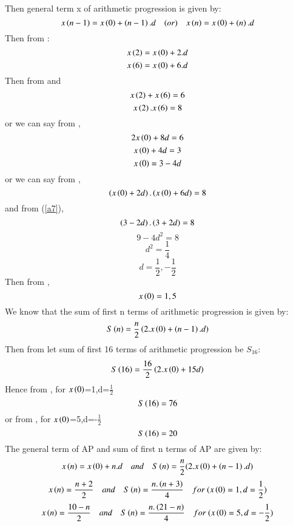 \documentclass[beamer]{IEEEtran}
\theoremstyle{remark}
\begin{document}
Then general term x of arithmetic progression is given by:
\begin{equation}
\label{a2}
x\left(n-1\right)=x\left(0\right)+\left(n-1\right).d\quad (or)\quad x\left(n\right)=x\left(0\right)+\left(n\right).d
\end{equation}
Then from \brak{\ref{a2}}:
\begin{equation}
\label{a3}
x\left(2\right) = x\left(0\right)+2.d
\end{equation}
\begin{equation}
\label{a4}
x\left(6\right)=x\left(0\right)+6.d
\end{equation} 
Then from \brak{\ref{a3}} and \brak{\ref{a4}}
\begin{equation}
\label{a5}
x\left(2\right)+x\left(6\right)=6
\end{equation}
\begin{equation}
\label{a6}
x\left(2\right).x\left(6\right)=8
\end{equation}
or we can say from \brak{\ref{a5}},
\[2x\left(0\right)+8d=6\]
\[x\left(0\right)+4d=3\]
\begin{equation}
\label{a7}
x\left(0\right)=3-4d
\end{equation}
or we can say from \brak{\ref{a6}},
$$\left(x\left(0\right)+2d\right).\left(x\left(0\right)+6d\right)=8$$
and from (\ref{a7}),
\[\left(3-2d\right).\left(3+2d\right)=8\]
\[9-4d^2=8\]
\[d^2=\frac{1}{4}\]
\begin{equation}
\label{a8}
d=\frac{1}{2},-\frac{1}{2}
\end{equation}
Then from \brak{\ref{a7}},
\begin{equation}
\label{a9}
x\left(0\right)=1,5
\end{equation}
We know that the sum of first n terms of arithmetic progression is given by:
\begin{equation}
\label{a10}
S\left(n\right)= \frac{n}{2}\left(2.x\left(0\right)+\left(n-1\right).d\right)
\end{equation}
Then from \brak{\ref{a10}} let sum of first 16 terms of arithmetic progression be $S_{16}$:
\begin{equation}
\label{general9}
S\left(16\right)= \frac{16}{2}\left(2.x\left(0\right)+15d\right)
\end{equation}
Hence from \brak{\ref{general9}},
for $x\left(0\right)$=1,d=$\frac{1}{2}$
$$S\left(16\right)=76$$
or from \brak{\ref{general9}},
for $x\left(0\right)$=5,d=-$\frac{1}{2}$
$$S\left(16\right)=20$$
The general term of AP  and sum of first n terms of AP  are given by:
$$x\left(n\right)=x\left(0\right)+n.d\quad and\quad S\left(n\right)=\frac{n}{2}(2.x\left(0\right)+\left(n-1\right).d)$$
$$x\brak{n}=\frac{n+2}{2}\quad and\quad S\brak{n}=\frac{n.\brak{n+3}}{4}\quad for\ (x\brak{0}=1,d=\frac{1}{2})$$
$$x\brak{n}=\frac{10-n}{2}\quad and\quad S\brak{n}=\frac{n.\brak{21-n}}{4}\quad for\ (x\brak{0}=5,d=-\frac{1}{2})$$
\end{document}
